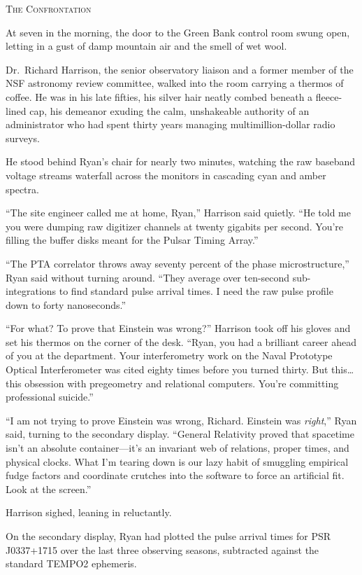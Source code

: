 \documentclass[12pt,twoside,openright]{book}
\newcommand{\sceneheader}[1]{%
  \par\vspace{1.8em}%
  {\noindent\centering\scshape\large #1\par}%
  \vspace{1.0em}%
  \noindent%
}
\newcommand{\dinkus}{%
  \par\vspace{1.2em}%
  {\noindent\centering{\large $\ast\quad\ast\quad\ast$}\par}%
  \vspace{1.2em}%
  \noindent%
}
\begin{document}
\dinkus

\sceneheader{The Confrontation}

At seven in the morning, the door to the Green Bank control room swung
open, letting in a gust of damp mountain air and the smell of wet wool.

Dr.~Richard Harrison, the senior observatory liaison and a former member
of the NSF astronomy review committee, walked into the room carrying a
thermos of coffee. He was in his late fifties, his silver hair neatly
combed beneath a fleece-lined cap, his demeanor exuding the calm,
unshakeable authority of an administrator who had spent thirty years
managing multimillion-dollar radio surveys.

He stood behind Ryan's chair for nearly two minutes, watching the raw
baseband voltage streams waterfall across the monitors in cascading cyan
and amber spectra.

``The site engineer called me at home, Ryan,'' Harrison said quietly.
``He told me you were dumping raw digitizer channels at twenty gigabits
per second. You're filling the buffer disks meant for the Pulsar Timing
Array.''

``The PTA correlator throws away seventy percent of the phase
microstructure,'' Ryan said without turning around. ``They average over
ten-second sub-integrations to find standard pulse arrival times. I need
the raw pulse profile down to forty nanoseconds.''

``For what? To prove that Einstein was wrong?'' Harrison took off his
gloves and set his thermos on the corner of the desk. ``Ryan, you had a
brilliant career ahead of you at the department. Your interferometry
work on the Naval Prototype Optical Interferometer was cited eighty
times before you turned thirty. But this\ldots{} this obsession with
pregeometry and relational computers. You're committing professional
suicide.''

``I am not trying to prove Einstein was wrong, Richard. Einstein was
\emph{right},'' Ryan said, turning to the secondary display. ``General
Relativity proved that spacetime isn't an absolute container---it's an
invariant web of relations, proper times, and physical clocks. What I'm
tearing down is our lazy habit of smuggling empirical fudge factors and
coordinate crutches into the software to force an artificial fit. Look
at the screen.''

Harrison sighed, leaning in reluctantly.

On the secondary display, Ryan had plotted the pulse arrival times for
PSR J0337+1715 over the last three observing seasons, subtracted against
the standard TEMPO2 ephemeris.
\end{document}
